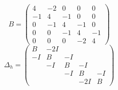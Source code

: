 \documentclass{article}
\begin{document}
\[
B=
\left(
\begin{array}{ccccc}
4 & -2 & 0 & 0 & 0 \\ 
-1 & 4 & -1 & 0 & 0 \\ 
0 & -1 & 4 & -1 & 0 \\ 
0 & 0 & -1 & 4 & -1 \\ 
0 & 0 & 0 & -2 & 4
\end{array} 
\right)
\]
\begin{equation}
	\Delta_{h}=
	\left(
	\begin{array}{ccccc}
		B & -2I &  &  &  \\ 
		-I & B & -I &  &  \\ 
		& -I & B & -I &  \\ 
		&  & -I & B & -I \\ 
		&  &  & -2I & B
	\end{array} 
	\right)\label{eq17}
\end{equation}
\end{document}
